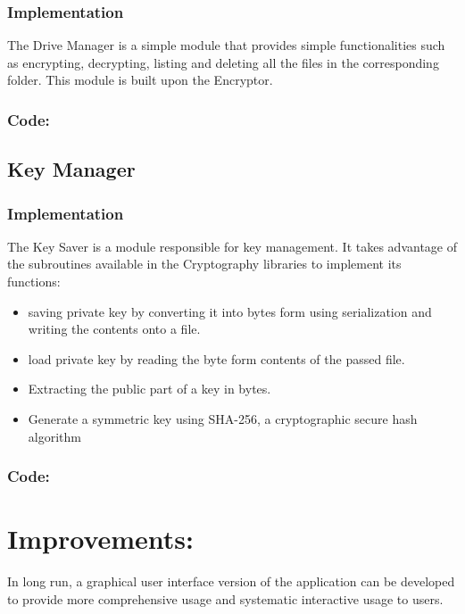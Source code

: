 \documentclass[12pt]{article}
\begin{document}
\subsubsection*{Implementation}
The Drive Manager is a simple module that provides simple functionalities such as encrypting, decrypting, listing and deleting all the files in the corresponding folder. This module is built upon the Encryptor. 
\vspace*{10mm}
\subsubsection*{Code:}

\newpage
\subsection*{Key Manager}
\subsubsection*{Implementation}
The Key Saver is a module responsible for key management. It takes advantage of the subroutines available in the Cryptography libraries to implement its functions:
\begin{itemize}
\item saving private key by converting it into bytes form using serialization and writing the contents onto a file.
\item load private key by reading the byte form contents of the passed file.
\item Extracting the public part of a key in bytes.
\item Generate a symmetric key using SHA-256, a cryptographic secure hash algorithm 
\end{itemize}
\vspace*{10mm}
\subsubsection*{Code:}
 
\vspace*{30mm}
\section*{Improvements:}
In long run, a graphical user interface version of the application can be developed to provide more comprehensive usage and systematic interactive usage to users. 
\end{document}
